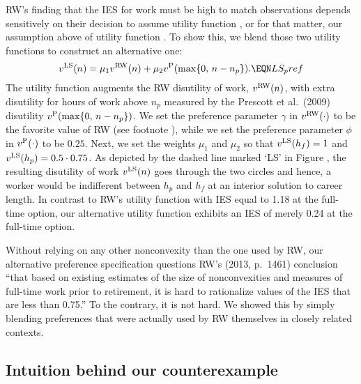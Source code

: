 RW's finding that the IES for work must be high to match
observations depends sensitively on their decision to assume  
utility function , or for that matter, our
assumption above of utility function . To show this, we
blend those two utility functions to construct an alternative one:
$$
v^{\rm LS}(n) = \mu_1 v^{\rm RW}(n) + 
                 \mu_2 v^{\rm P}( \max \{0,\, n-n_p \} ).
                                                   \EQN LS_pref
$$
The utility function  augments the RW disutility of work, 
$v^{\rm RW}(n)$, 
with extra disutility for hours of work above $n_p$ measured
by the Prescott et al.\ (2009)   disutility 
$v^{\rm P}( \max \{0,\, n-n_p \})$. We set the 
preference parameter $\gamma$ in $v^{\rm RW}(\cdot)$  
to be the favorite value of RW (see footnote ), 
while we set the preference parameter
$\phi$ in $v^{\rm P}(\cdot)$  to be $0.25$. Next,
we set the weights $\mu_1$ and $\mu_2$  so that 
$v^{\rm LS}(h_f) = 1$ and 
$v^{\rm LS}(h_p) = 0.5 \cdot 0.75$.
As depicted by the dashed line marked `LS' in Figure , 
the resulting disutility of work $v^{\rm LS}(n)$ goes through
the two circles and hence, a worker would be indifferent between 
$h_p$ and $h_f$ at an interior solution to career length.
In contrast to RW's utility function with
IES equal to 1.18 at the full-time option, our alternative
utility function exhibits an IES of merely 0.24 at the full-time
option.


Without relying on any other nonconvexity than the one used by
RW, our alternative preference specification questions
RW's (2013, p.~1461) conclusion ``that based on existing estimates 
of the size of nonconvexities and measures of full-time work prior 
to retirement, it is hard to rationalize values of the IES that are 
less than 0.75.'' To the contrary, it is not hard.  We showed this  
by simply blending preferences that were actually used by RW themselves
in closely related contexts.  


\subsection{Intuition behind our counterexample}

